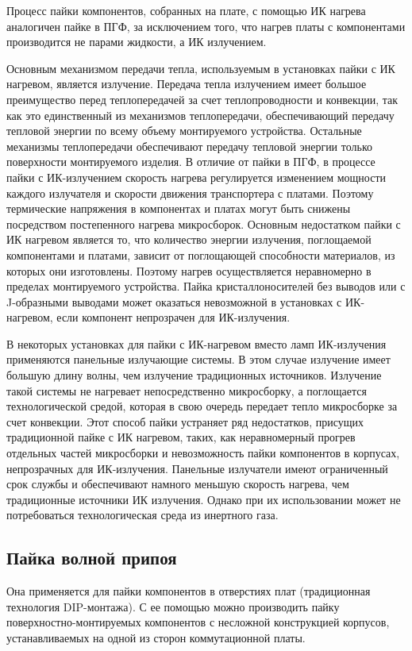 \documentclass[unicode, 12pt, a4paper, oneside]{article}
\begin{document}
Процесс пайки компонентов, собранных на плате, с помощью ИК нагрева аналогичен пайке в ПГФ, за исключением того, что нагрев платы с компонентами производится не парами жидкости, а ИК излучением.

Основным механизмом передачи тепла, используемым в установках пайки с ИК нагревом, является излучение. Передача тепла излучением имеет большое преимущество перед теплопередачей за счет теплопроводности и конвекции, так как это единственный из механизмов теплопередачи, обеспечивающий передачу тепловой энергии по всему объему монтируемого устройства. Остальные механизмы теплопередачи обеспечивают передачу тепловой энергии только поверхности монтируемого изделия. В отличие от пайки в ПГФ, в процессе пайки с ИК-излучением скорость нагрева регулируется изменением мощности каждого излучателя и скорости движения транспортера с платами. Поэтому термические напряжения в компонентах и платах могут быть снижены посредством постепенного нагрева микросборок. Основным недостатком пайки с ИК нагревом является то, что количество энергии излучения, поглощаемой компонентами и платами, зависит от поглощающей способности материалов, из которых они изготовлены. Поэтому нагрев осуществляется неравномерно в пределах монтируемого устройства. Пайка кристаллоносителей без выводов или с J-образными выводами может оказаться невозможной в установках с ИК-нагревом, если компонент непрозрачен для ИК-излучения.

В некоторых установках для пайки с ИК-нагревом вместо ламп ИК-излучения применяются панельные излучающие системы. В этом случае излучение имеет большую длину волны, чем излучение традиционных источников. Излучение такой системы не нагревает непосредственно микросборку, а поглощается технологической средой, которая в свою очередь передает тепло микросборке за счет конвекции. Этот способ пайки устраняет ряд недостатков, присущих традиционной пайке с ИК нагревом, таких, как неравномерный прогрев отдельных частей микросборки и невозможность пайки компонентов в корпусах, непрозрачных для ИК-излучения. Панельные излучатели имеют ограниченный срок службы и обеспечивают намного меньшую скорость нагрева, чем традиционные источники ИК излучения. Однако при их использовании может не потребоваться технологическая среда из инертного газа.

\subsection*{Пайка волной припоя}

Она применяется для пайки компонентов в отверстиях плат (традиционная технология DIP-монтажа). С ее помощью можно производить пайку поверхностно-монтируемых компонентов с несложной конструкцией корпусов, устанавливаемых на одной из сторон коммутационной платы.
\end{document}
